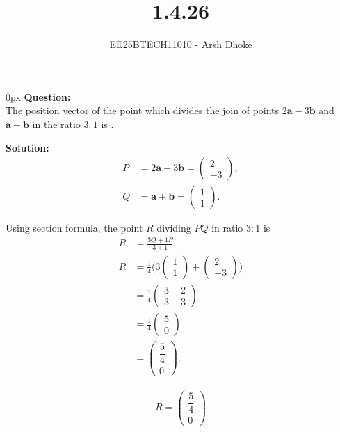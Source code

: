 \documentclass[journal]{IEEEtran}
\renewcommand{\vec}[1]{\mathbf{#1}}
\newcommand{\solution}{\textbf{Solution: }}
\newcommand{\brak}[1]{\begin{pmatrix}#1\end{pmatrix}}
\begin{document}

\vspace{3cm}

\title{1.4.26}
\author{EE25BTECH11010 - Arsh Dhoke}
{\let\newpage\relax\maketitle}

\renewcommand{\thefigure}{\theenumi}
\renewcommand{\thetable}{\theenumi}
\setlength{\intextsep}{10pt}

\parindent 0px
\textbf{Question:} \\
The position vector of the point which divides the join of points $2\vec{a} - 3\vec{b}$ and $\vec{a} + \vec{b}$ in the ratio $3:1$ is \underline{\hspace{2cm}}.

\solution \\

\begin{align}
P &= 2\vec{a} - 3\vec{b}
   = \brak{2\\-3}, \\
Q &= \vec{a} + \vec{b}
   = \brak{1\\1}.
\end{align}

Using section formula, the point $R$ dividing $PQ$ in ratio $3:1$ is
\begin{align}
R &= \frac{3Q + 1P}{3+1}. \\
R
&= \frac{1}{4}\Big(3\brak{1\\1}+\brak{2\\-3}\Big) \\[6pt]
&= \frac{1}{4}\brak{3+2\\3-3} \\[6pt]
&= \frac{1}{4}\brak{5\\0} \\[6pt]
&= \brak{\dfrac{5}{4}\\0}.
\end{align}

\begin{align}
\boxed{\,R = \brak{\dfrac{5}{4}\\0}\,}
\end{align}
\end{document}
